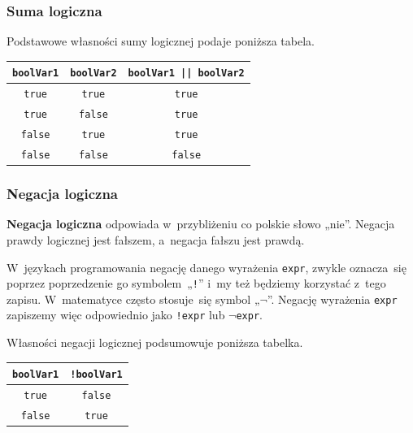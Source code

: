 \documentclass[10pt,t]{beamer}
\begin{document}
\begin{frame}
  \frametitle{Suma logiczna}


  Podstawowe własności sumy logicznej podaje poniższa tabela.

  \vspace{1em}





  \begingroup

  \centering

  \begin{tabular}{|c|c|c|}
    \hline
    \texttt{boolVar1} & \texttt{boolVar2}
    & \texttt{boolVar1 || boolVar2} \\
    \hline
    \texttt{true}  & \texttt{true}  & \texttt{true}  \\
    \texttt{true}  & \texttt{false} & \texttt{true}  \\
    \texttt{false} & \texttt{true}  & \texttt{true}  \\
    \texttt{false} & \texttt{false} & \texttt{false} \\
    \hline
  \end{tabular}

  \endgroup

\end{frame}





\begin{frame}
  \frametitle{Negacja logiczna}


  \textbf{Negacja logiczna} odpowiada w~przybliżeniu co polskie słowo „nie”.
  Negacja prawdy logicznej jest fałszem, a~negacja fałszu jest prawdą.

  W~językach programowania negację danego wyrażenia \texttt{expr}, zwykle
  oznacza~się poprzez poprzedzenie go symbolem~„\texttt{!}” i~my też
  będziemy korzystać z~tego zapisu. W~matematyce często stosuje~się symbol
  „\texttt{$\neg$}”. Negację wyrażenia \texttt{expr} zapiszemy więc odpowiednio
  jako \texttt{!expr} lub \texttt{$\neg$expr}.

  Własności negacji logicznej podsumowuje poniższa tabelka.

  \vspace{1em}





  \begingroup

  \centering

  \begin{tabular}{|c|c|}
    \hline
    \texttt{boolVar1} & \texttt{!boolVar1} \\
    \hline
    \texttt{true}  & \texttt{false} \\
    \texttt{false} & \texttt{true}  \\
    \hline
  \end{tabular}

  \endgroup

\end{frame}
\end{document}
